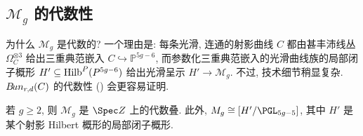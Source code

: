 \subsection{\texorpdfstring{$\mathcal M_g$}{Mg} 的代数性}\label{src:4.1.5-subsection}
为什么 $\mathcal M_g$ 是代数的? 一个理由是: 每条光滑, 连通的射影曲线 $C$ 都由甚丰沛线丛 $\Omega_C^{\otimes3}$ 给出三重典范嵌入 $C\hookrightarrow\mathbb P^{5g-6}$, 而参数化三重典范嵌入的光滑曲线族的局部闭子概形 $H'\subseteq\operatorname{Hilb}^P(P^{5g-6})$ 给出光滑呈示 $H'\to\mathcal M_g$. 不过, 技术细节稍显复杂. $B\!un_{r,d}(C)$ 的代数性 () 会更容易证明.
\begin{theorem}\label{src:4.1.17}
若 $g\geq2$, 则 $\mathcal M_g$ 是 $\Spec\mathbb Z$ 上的代数叠. 此外, $\mathcal M_g\cong[H'/\PGL_{5g-5}]$, 其中 $H'$ 是某个射影 Hilbert 概形的局部闭子概形.
\end{theorem}
